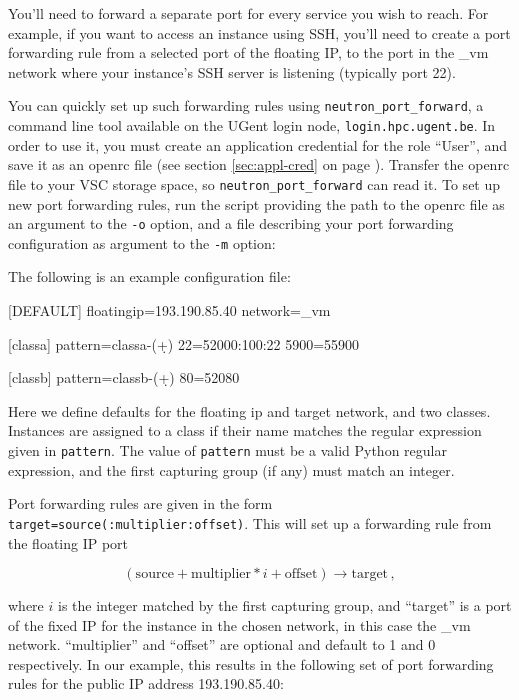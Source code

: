 You'll need to forward a separate port for every service you wish to
reach.  For example, if you want to access an instance using SSH,
you'll need to create a port forwarding rule from a selected port of
the floating IP, to the port in the \_vm network where your instance's
SSH server is listening (typically port 22).

You can quickly set up such forwarding rules using
\lstinline{neutron_port_forward}, a command line tool available on the
UGent login node, \lstinline{login.hpc.ugent.be}.  In order to use it,
you must create an application credential for the role ``User'', and
save it as an openrc file (see section \ref{sec:appl-cred} on page
\pageref{sec:appl-cred}).  Transfer the openrc file to your VSC
storage space, so \lstinline{neutron_port_forward} can read it.  To
set up new port forwarding rules, run the script providing the path to
the openrc file as an argument to the \lstinline{-o} option, and a
file describing your port forwarding configuration as argument to the
\lstinline{-m} option:

\begin{prompt}
\end{prompt}

The following is an example configuration file:
\begin{code}{}
[DEFAULT]
floatingip=193.190.85.40
network=_vm

[classa]
pattern=classa-(\d+)
22=52000:100:22
5900=55900

[classb]
pattern=classb-(\d+)
80=52080
\end{code}

Here we define defaults for the floating ip and target network, and
two classes.  Instances are assigned to a class if their name matches
the regular expression given in \lstinline{pattern}.  The value of
\lstinline{pattern} must be a valid Python regular expression, and the
first capturing group (if any) must match an integer.

Port forwarding rules are given in the form
\lstinline{target=source(:multiplier:offset)}.  This will set up a
forwarding rule from the floating IP port

$$ (\mathrm{source} + \mathrm{multiplier} * i + \mathrm{offset}) \rightarrow \mathrm{target}\, ,$$

where $i$ is the integer matched by the first capturing group, and
``target'' is a port of the fixed IP for the instance in the chosen
network, in this case the \_vm network.  ``multiplier'' and ``offset''
are optional and default to 1 and 0 respectively.  In our example,
this results in the following set of port forwarding rules for
the public IP address 193.190.85.40:

